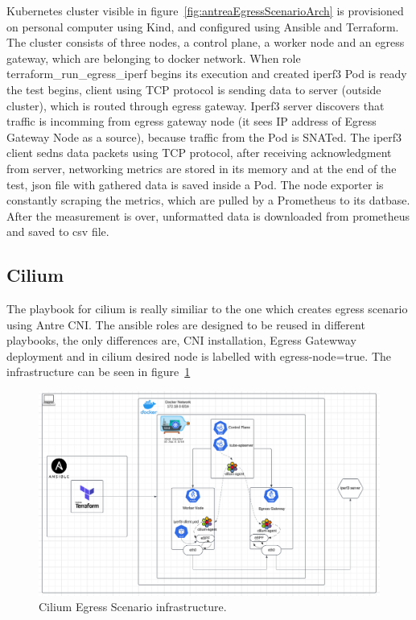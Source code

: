 Kubernetes cluster visible in figure~\ref{fig:antreaEgressScenarioArch} is provisioned on personal computer using Kind, and configured using Ansible and Terraform. The cluster consists of three nodes, a control plane, a worker node and an egress gateway, which are belonging to docker network. When role terraform\_run\_egress\_iperf begins its execution and created iperf3 Pod is ready the test begins, client using TCP protocol is sending data to server (outside cluster), which is routed through egress gateway. Iperf3 server discovers that traffic is incomming from egress gateway node (it sees IP address of Egress Gateway Node as a source), because traffic from the Pod is SNATed.
The iperf3 client sedns data packets using TCP protocol, after receiving acknowledgment from server, networking metrics are stored in its memory and at the end of the test, json file with gathered data is saved inside a Pod. The node exporter is constantly scraping the metrics, which are pulled by a Prometheus to its datbase. After the measurement is over, unformatted data is downloaded from prometheus and saved to csv file.



\subsection{Cilium}
\label{sec:ciliumEgress}

The playbook for cilium is really similiar to the one which creates egress scenario using Antre CNI. The ansible roles are designed to be reused in different playbooks, the only differences are, CNI installation, Egress Gatewway deployment and in cilium desired node is labelled with egress-node=true. The infrastructure can be seen in figure~\ref{fig:ciliumEgressGatewayScenarioArch} %

\begin{figure}[H]
  \centering
  \includegraphics[width=1\columnwidth]{images/cilium_egress_gatateway_cluster.png}
  \caption{Cilium Egress Scenario infrastructure.}
  \label{fig:ciliumEgressGatewayScenarioArch}
\end{figure}

